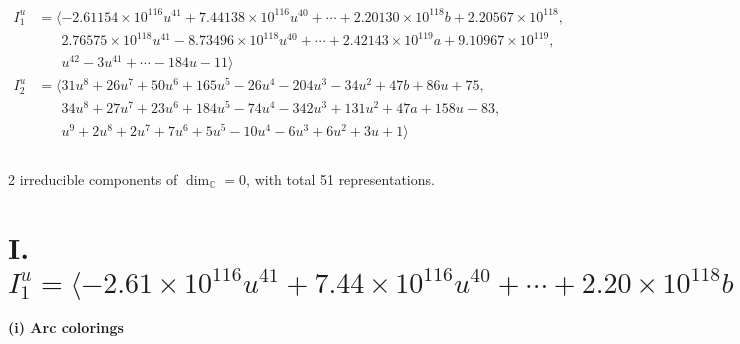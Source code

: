 \documentclass[1p]{elsarticle_modified}
\theoremstyle{definition}
\begin{document}
\begin{align*}
I^u_{1}&=\langle 
-2.61154\times10^{116} u^{41}+7.44138\times10^{116} u^{40}+\cdots+2.20130\times10^{118} b+2.20567\times10^{118},\\
\phantom{I^u_{1}}&\phantom{= \langle  }2.76575\times10^{118} u^{41}-8.73496\times10^{118} u^{40}+\cdots+2.42143\times10^{119} a+9.10967\times10^{119},\\
\phantom{I^u_{1}}&\phantom{= \langle  }u^{42}-3 u^{41}+\cdots-184 u-11\rangle \\
I^u_{2}&=\langle 
31 u^8+26 u^7+50 u^6+165 u^5-26 u^4-204 u^3-34 u^2+47 b+86 u+75,\\
\phantom{I^u_{2}}&\phantom{= \langle  }34 u^8+27 u^7+23 u^6+184 u^5-74 u^4-342 u^3+131 u^2+47 a+158 u-83,\\
\phantom{I^u_{2}}&\phantom{= \langle  }u^9+2 u^8+2 u^7+7 u^6+5 u^5-10 u^4-6 u^3+6 u^2+3 u+1\rangle \\
\\
\end{align*}
\raggedright * 2 irreducible components of $\dim_{\mathbb{C}}=0$, with total 51 representations.\\
\newpage
\renewcommand{\arraystretch}{1}
\centering \section*{I. $I^u_{1}= \langle -2.61\times10^{116} u^{41}+7.44\times10^{116} u^{40}+\cdots+2.20\times10^{118} b+2.21\times10^{118},\;2.77\times10^{118} u^{41}-8.73\times10^{118} u^{40}+\cdots+2.42\times10^{119} a+9.11\times10^{119},\;u^{42}-3 u^{41}+\cdots-184 u-11 \rangle$}
\flushleft \textbf{(i) Arc colorings}\\
\end{document}
